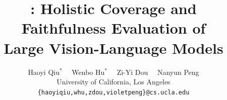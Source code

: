 \documentclass[11pt]{article}
\begin{document}
\title{\eval{}: Holistic Coverage and Faithfulness Evaluation of \\ Large Vision-Language Models} %





\author{Haoyi Qiu$^*$ ~~Wenbo Hu$^*$ ~~Zi-Yi Dou ~~Nanyun Peng \\ University of California, Los Angeles \\ \texttt{\{haoyiqiu,whu,zdou,violetpeng\}@cs.ucla.edu}}
\end{document}
